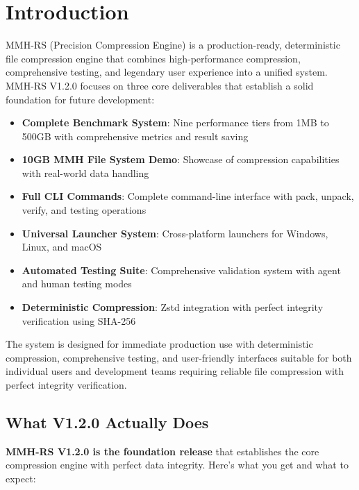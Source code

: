 \documentclass[11pt,a4paper]{article}
\begin{document}
	\section{Introduction}
	\label{sec:intro}
	
	MMH-RS (Precision Compression Engine) is a production-ready, deterministic file compression engine that combines high-performance compression, comprehensive testing, and legendary user experience into a unified system. MMH-RS V1.2.0 focuses on three core deliverables that establish a solid foundation for future development:
	
	\begin{itemize}
		\item \textbf{Complete Benchmark System}: Nine performance tiers from 1MB to 500GB with comprehensive metrics and result saving
		\item \textbf{10GB MMH File System Demo}: Showcase of compression capabilities with real-world data handling
		\item \textbf{Full CLI Commands}: Complete command-line interface with pack, unpack, verify, and testing operations
		\item \textbf{Universal Launcher System}: Cross-platform launchers for Windows, Linux, and macOS
		\item \textbf{Automated Testing Suite}: Comprehensive validation system with agent and human testing modes
		\item \textbf{Deterministic Compression}: Zstd integration with perfect integrity verification using SHA-256
	\end{itemize}
	
	The system is designed for immediate production use with deterministic compression, comprehensive testing, and user-friendly interfaces suitable for both individual users and development teams requiring reliable file compression with perfect integrity verification.
	
	\subsection{What V1.2.0 Actually Does}
	
	\textbf{MMH-RS V1.2.0 is the foundation release} that establishes the core compression engine with perfect data integrity. Here's what you get and what to expect:
	
\end{document}
